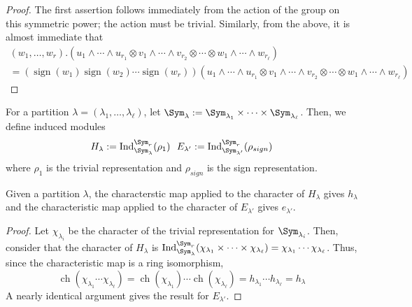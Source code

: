 \documentclass[11pt,leqno,oneside]{amsart}
\numberwithin{thm}{section}
\newcommand{\ch}{\operatorname{ch}}
\newcommand{\sign}{\operatorname{sign}}
\newcommand{\Ind}{\operatorname{Ind}}
\begin{document}
\begin{proof}
  The first assertion follows immediately from the action of the group
  on this symmetric power; the action must be trivial. Similarly, from
  the above, it is almost immediate that \begin{align*}
    (w_1, \ldots, w_r).(u_1 \wedge \cdots \wedge u_{r_1} \otimes v_1
    \wedge \cdots \wedge v_{r_2} \otimes \cdots \otimes w_1 \wedge
    \cdots \wedge w_{r_\ell} ) \\ = (\sign(w_1) \sign(w_2) \cdots \sign(w_r))(u_1 \wedge \cdots \wedge u_{r_1} \otimes v_1
    \wedge \cdots \wedge v_{r_2} \otimes \cdots \otimes w_1 \wedge
    \cdots \wedge w_{r_\ell} )
  \end{align*}
\end{proof}
\begin{defn}
  For a partition \(\lambda = (\lambda_1, \ldots, \lambda_\ell)\), let
  \(\Sym_\lambda := \Sym_{\lambda_1} \times \cdots \times
  \Sym_{\lambda_\ell}\). Then, we define induced modules \[
    H_\lambda := \Ind_{\Sym_\lambda}^{\Sym_r}(\rho_1) \ \ E_{\lambda'}
    := \Ind_{\Sym_{\lambda'}}^{\Sym_r}(\rho_{sign})
  \]
  where \(\rho_1\) is the trivial representation and \(\rho_{sign}\)
  is the sign representation.
\end{defn}
\begin{prop}
  Given a partition \(\lambda\), the characterstic map applied to the
  character of 
  \(H_\lambda\) gives \(h_\lambda\) and the characteristic map applied
  to the character of \(E_{\lambda'}\) gives \(e_{\lambda'}\).
\end{prop}
\begin{proof}
  Let \(\chi_{\lambda_i}\) be the character of the trivial
  representation for \(\Sym_{\lambda_i}\). Then,
  consider that the character of \(H_\lambda\) is
  \(\Ind_{\Sym_{\lambda}}^{\Sym_r}(\chi_{\lambda_1} \times \cdots
  \times \chi_{\lambda_\ell}) = \chi_{\lambda_1} \cdots
  \chi_{\lambda_\ell}\). Thus, since the characteristic map is a ring
  isomorphism, \[
    \ch(\chi_{\lambda_1} \cdots
  \chi_{\lambda_\ell}) = \ch(\chi_{\lambda_1}) \cdots
  \ch(\chi_{\lambda_\ell}) = h_{\lambda_1} \cdots h_{\lambda_\ell} =
  h_\lambda 
  \]
  A nearly identical argument gives the result for \(E_{\lambda'}\).
\end{proof}
\end{document}
